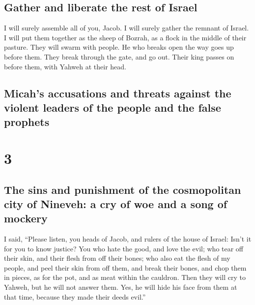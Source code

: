 \hypertarget{gather-and-liberate-the-rest-of-israel}{%
\subsection{Gather and liberate the rest of
Israel}\label{gather-and-liberate-the-rest-of-israel}}

 I will surely assemble all of you, Jacob. I will surely
gather the remnant of Israel. I will put them together as the sheep of
Bozrah, as a flock in the middle of their pasture. They will swarm with
people.  He who breaks open the way goes up before them.
They break through the gate, and go out. Their king passes on before
them, with Yahweh at their head.

\hypertarget{micahs-accusations-and-threats-against-the-violent-leaders-of-the-people-and-the-false-prophets}{%
\subsection{Micah's accusations and threats against the violent leaders
of the people and the false
prophets}\label{micahs-accusations-and-threats-against-the-violent-leaders-of-the-people-and-the-false-prophets}}

\hypertarget{section-2}{%
\section{3}\label{section-2}}

\hypertarget{the-sins-and-punishment-of-the-cosmopolitan-city-of-nineveh-a-cry-of-woe-and-a-song-of-mockery}{%
\subsection{The sins and punishment of the cosmopolitan city of Nineveh:
a cry of woe and a song of
mockery}\label{the-sins-and-punishment-of-the-cosmopolitan-city-of-nineveh-a-cry-of-woe-and-a-song-of-mockery}}

 I said, ``Please listen, you heads of Jacob, and rulers
of the house of Israel: Isn't it for you to know justice? 
You who hate the good, and love the evil; who tear off their skin, and
their flesh from off their bones;  who also eat the flesh
of my people, and peel their skin from off them, and break their bones,
and chop them in pieces, as for the pot, and as meat within the
cauldron.  Then they will cry to Yahweh, but he will not
answer them. Yes, he will hide his face from them at that time, because
they made their deeds evil.''

